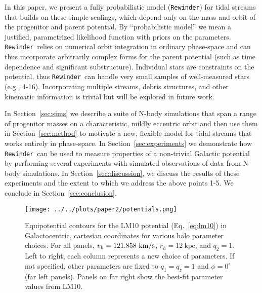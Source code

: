 \documentclass[letterpaper,12pt,preprint]{aastex}
\newcommand{\vhalo}{v_{\rm h}}
\newcommand{\rewinder}{\texttt{Rewinder}}
\begin{document}
In this paper, we present a fully probabilistic model (\rewinder) for tidal streams that builds on these simple scalings, which depend only on the mass and orbit of the progenitor and parent potential. By ``probabilistic model'' we mean a justified, parametrized likelihood function with priors on the parameters. \rewinder\ relies on numerical orbit integration in ordinary phase-space and can thus incorporate arbitrarily complex forms for the parent potential (such as time dependence and significant substructure). Individual stars are constraints on the potential, thus \rewinder\ can handle very small samples of well-measured stars (e.g., 4-16). Incorporating multiple streams, debris structures, and other kinematic information is trivial but will be explored in future work.

In Section~\ref{sec:sims} we describe a suite of N-body simulations that span a range of progenitor masses on a characteristic, mildly eccentric orbit and then use them in Section~\ref{sec:method} to motivate a new, flexible model for tidal streams that works entirely in phase-space. In Section~\ref{sec:experiments} we demonstrate how \rewinder\ can be used to measure properties of a non-trivial Galactic potential by performing several experiments with simulated observations of data from N-body simulations. In Section~\ref{sec:discussion}, we discuss the results of these experiments and the extent to which we address the above points 1-5. We conclude in Section~\ref{sec:conclusion}.

\begin{figure*}[!ht]
\begin{center}
\texttt{[image: ../../plots/paper2/potentials.png]}
\caption{ Equipotential contours for the LM10 potential (Eq.~\ref{eq:lm10}) in Galactocentric, cartesian coordinates for various halo parameter choices. For all panels, $\vhalo=121.858~\mathrm{km}/\mathrm{s}$, $r_h=12~\mathrm{kpc}$, and $q_2=1$. Left to right, each column represents a new choice of parameters. If not specified, other parameters are fixed to $q_1=q_z=1$ and $\phi=0^\circ$ (far left panels). Panels on far right show the best-fit parameter values from LM10. }\label{fig:potential}
\end{center}
\end{figure*}
\end{document}
